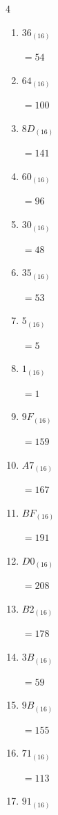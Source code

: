 \begin{multicols}{4}
\begin{enumerate}
  \item $36_{(16)}$

        $=54$

  \item $64_{(16)}$

        $=100$

  \item $8D_{(16)}$

        $=141$

  \item $60_{(16)}$

        $=96$

  \item $30_{(16)}$

        $=48$

  \item $35_{(16)}$

        $=53$

  \item $5_{(16)}$

        $=5$

  \item $1_{(16)}$

        $=1$

  \item $9F_{(16)}$

        $=159$

  \item $A7_{(16)}$

        $=167$

  \item $BF_{(16)}$

        $=191$

  \item $D0_{(16)}$

        $=208$

  \item $B2_{(16)}$

        $=178$

  \item $3B_{(16)}$

        $=59$

  \item $9B_{(16)}$

        $=155$

\columnbreak %

  \item $71_{(16)}$

        $=113$

  \item $91_{(16)}$


\end{enumerate}
\end{multicols}
